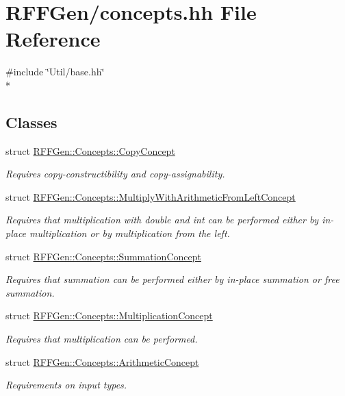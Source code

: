 \hypertarget{concepts_8hh}{\section{R\-F\-F\-Gen/concepts.hh File Reference}
\label{concepts_8hh}
}
{\ttfamily \#include \char`\"{}Util/base.\-hh\char`\"{}}\\*
\subsection*{Classes}
\begin{DoxyCompactItemize}
\item 
struct \hyperlink{structRFFGen_1_1Concepts_1_1CopyConcept}{R\-F\-F\-Gen\-::\-Concepts\-::\-Copy\-Concept}
\begin{DoxyCompactList}\small\item\em Requires copy-\/constructibility and copy-\/assignability. \end{DoxyCompactList}\item 
struct \hyperlink{structRFFGen_1_1Concepts_1_1MultiplyWithArithmeticFromLeftConcept}{R\-F\-F\-Gen\-::\-Concepts\-::\-Multiply\-With\-Arithmetic\-From\-Left\-Concept}
\begin{DoxyCompactList}\small\item\em Requires that multiplication with double and int can be performed either by in-\/place multiplication or by multiplication from the left. \end{DoxyCompactList}\item 
struct \hyperlink{structRFFGen_1_1Concepts_1_1SummationConcept}{R\-F\-F\-Gen\-::\-Concepts\-::\-Summation\-Concept}
\begin{DoxyCompactList}\small\item\em Requires that summation can be performed either by in-\/place summation or free summation. \end{DoxyCompactList}\item 
struct \hyperlink{structRFFGen_1_1Concepts_1_1MultiplicationConcept}{R\-F\-F\-Gen\-::\-Concepts\-::\-Multiplication\-Concept}
\begin{DoxyCompactList}\small\item\em Requires that multiplication can be performed. \end{DoxyCompactList}\item 
struct \hyperlink{structRFFGen_1_1Concepts_1_1ArithmeticConcept}{R\-F\-F\-Gen\-::\-Concepts\-::\-Arithmetic\-Concept}
\begin{DoxyCompactList}\small\item\em Requirements on input types. \end{DoxyCompactList}\item 

\end{DoxyCompactItemize}
